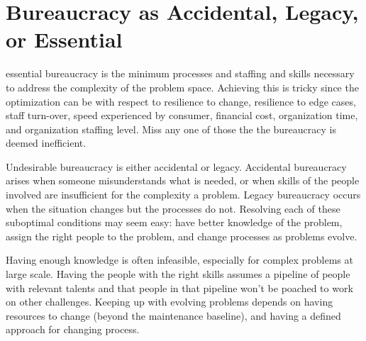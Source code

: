 \section{Bureaucracy as Accidental, Legacy, or Essential}
\gls{essential bureaucracy} is the minimum processes and staffing and skills necessary to address the complexity of the problem space. Achieving this is tricky since the optimization can be with respect to resilience to change, resilience to edge cases, staff turn-over, speed experienced by consumer, financial cost, organization time, and organization staffing level. Miss any one of those the the bureaucracy is deemed inefficient.

Undesirable bureaucracy is either accidental or legacy. Accidental bureaucracy arises when someone misunderstands what is needed, or when skills of the people involved are insufficient for the complexity a problem. Legacy bureaucracy occurs when the situation changes but the processes do not. Resolving each of these suboptimal conditions may seem easy: have better knowledge of the problem, assign the right people to the problem, and change processes as problems evolve. 

Having enough knowledge is often infeasible, especially for complex problems at large scale. Having the people with the right skills assumes a pipeline of people with relevant talents and that people in that pipeline won't be poached to work on other challenges. Keeping up with evolving problems depends on having resources to change (beyond the maintenance baseline), and having a defined approach for changing process. 